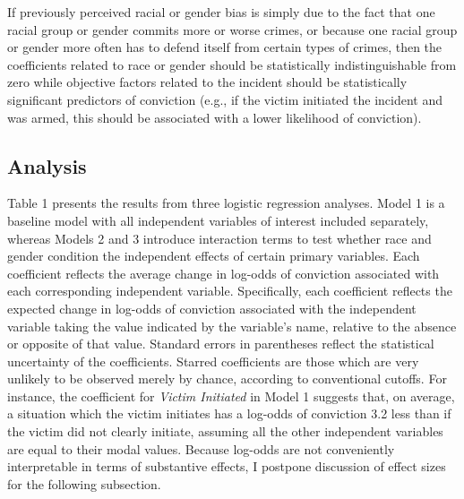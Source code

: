 \documentclass[12pt,article]{article}
\begin{document}
If previously perceived racial or gender bias is simply due to the fact
that one racial group or gender commits more or worse crimes, or because
one racial group or gender more often has to defend itself from certain
types of crimes, then the coefficients related to race or gender should
be statistically indistinguishable from zero while objective factors
related to the incident should be statistically significant predictors
of conviction (e.g., if the victim initiated the incident and was armed,
this should be associated with a lower likelihood of conviction).

\subsection{Analysis}\label{analysis}

Table 1 presents the results from three logistic regression analyses.
Model 1 is a baseline model with all independent variables of interest
included separately, whereas Models 2 and 3 introduce interaction terms
to test whether race and gender condition the independent effects of
certain primary variables. Each coefficient reflects the average change
in log-odds of conviction associated with each corresponding independent
variable. Specifically, each coefficient reflects the expected change in
log-odds of conviction associated with the independent variable taking
the value indicated by the variable's name, relative to the absence or
opposite of that value. Standard errors in parentheses reflect the
statistical uncertainty of the coefficients. Starred coefficients are
those which are very unlikely to be observed merely by chance, according
to conventional cutoffs. For instance, the coefficient for \emph{Victim
Initiated} in Model 1 suggests that, on average, a situation which the
victim initiates has a log-odds of conviction 3.2 less than if the
victim did not clearly initiate, assuming all the other independent
variables are equal to their modal values. Because log-odds are not
conveniently interpretable in terms of substantive effects, I postpone
discussion of effect sizes for the following subsection.
\end{document}
